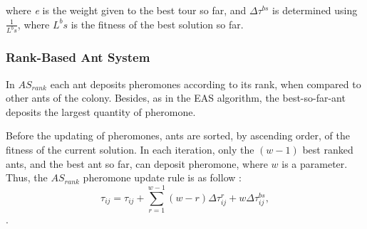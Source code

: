 		\noindent where \emph{e} is the weight given to the best tour so far, and $\Delta\tau^{bs}$ is determined using $\frac{1} {L^bs}$, where ${L^bs}$ is the fitness of the best solution so far. 

					\subsubsection*{Rank-Based Ant System}

					In $AS_{rank}$ each ant deposits pheromones according to its rank, when compared to other ants of the colony. Besides, as in the EAS algorithm, the best-so-far-ant deposits the largest quantity of pheromone.

					Before the updating of pheromones, ants are sorted, by ascending order, of the fitness of the current solution. In each iteration, only the $(w-1)$ best ranked ants, and the best ant so far, can deposit pheromone, where $w$ is a parameter. Thus, the $AS_{rank}$ pheromone update rule is as follow \cite{bullnheimer97}:
					\begin{equation}
						\label{eq:asrank_pheromone_update}
						\tau_{ij} = \tau_{ij} + \sum_{r=1}^{w-1}(w-r)\Delta\tau_{ij}^r + w\Delta\tau_{ij}^{bs},
					\end{equation}.



